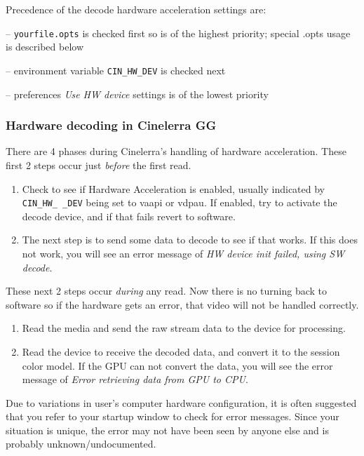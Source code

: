 Precedence of the decode hardware acceleration settings are:

-- \texttt{yourfile.opts} is checked first so is of the highest priority; special .opts usage is described below

-- environment variable \texttt{CIN\_HW\_DEV} is checked next

-- preferences \textit{Use HW device} settings is of the lowest priority

\subsubsection*{Hardware decoding in Cinelerra GG}%
\label{ssub:hardware_decoding_cinelerra}

There are 4 phases during Cinelerra’s handling of hardware acceleration. These first 2 steps occur just \textit{before} the first read.

\begin{enumerate}
	\item Check to see if Hardware Acceleration is enabled, usually indicated by \texttt{CIN\_HW\_ \_DEV} being set to
	vaapi or vdpau.  If enabled, try to activate the decode device, and if that fails revert to software.
	\item The next step is to send some data to decode to see if that works. If this does not work, you will see
	an error message of \textit{HW device init failed, using SW decode}.
\end{enumerate}

\noindent These next 2 steps occur \textit{during} any read.  Now there is no turning back to software so if the hardware gets an error, that video will not be handled correctly.

\begin{enumerate} [resume]
	\item Read the media and send the raw stream data to the device for processing.
	\item Read the device to receive the decoded data, and convert it to the session color model.  If the GPU
	can not convert the data, you will see the error message of \textit{Error retrieving data from GPU to CPU}.
\end{enumerate}

Due to variations in user’s computer hardware configuration, it is often suggested that you refer to your startup window to check for error messages.   Since your situation is unique, the error may not have been seen by anyone else and is probably unknown/undocumented.

